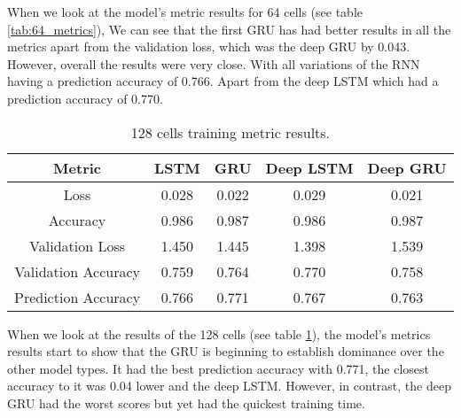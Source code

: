 \documentclass[a4paper,10pt]{article}
\begin{document}
	When we look at the model's metric results for 64 cells (see table \ref{tab:64_metrics}), We can see that the first GRU has had better results in all the metrics apart from the validation loss, which was the deep GRU by 0.043. However, overall the results were very close. With all variations of the RNN having a prediction accuracy of 0.766. Apart from the deep LSTM which had a prediction accuracy of 0.770.


	\begin{table}[ht]
		\centering
		\small
		\begin{tabular}[t]{ | c | c | c | c | c | }
			\hline
			Metric          & LSTM      & GRU   & Deep LSTM & Deep GRU \\ 
			\hline
			Loss            & 0.028     & 0.022 & 0.029     & 0.021 \\ 
			\hline
			Accuracy        & 0.986     & 0.987 & 0.986     & 0.987  \\ 
			\hline
			Validation Loss & 1.450     & 1.445 & 1.398     & 1.539 \\
			\hline
			Validation Accuracy & 0.759 & 0.764 & 0.770     & 0.758 \\
			\hline
			Prediction Accuracy & 0.766     & 0.771 & 0.767     & 0.763 \\
			\hline
		\end{tabular}
		\caption{128 cells training metric results.}
		\label{tab:128_metrics}
	\end{table}%


	When we look at the results of the 128 cells (see table \ref{tab:128_metrics}), the model's metrics results start to show that the GRU is beginning to establish dominance over the other model types. It had the best prediction accuracy with 0.771, the closest accuracy to it was 0.04 lower and the deep LSTM. However, in contrast, the deep GRU had the worst scores but yet had the quickest training time.
	
\end{document}
